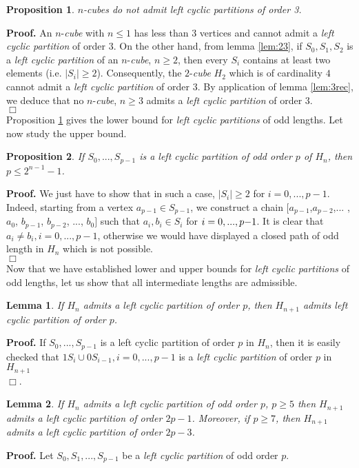 \documentclass{article}
\newtheorem{lemma}{Lemma}
\newtheorem{proposition}{Proposition}
\begin{document}
\begin{proposition}  \label{prop:pas3}
$n$-cubes do not  admit left cyclic partitions of order 3. 
\end{proposition}
{\bf Proof.} An $n$-{\em cube} with $n\leq 1$ has less than $3$ vertices and
 cannot admit a {\em left cyclic partition} of order $3$. On the other hand,
 from lemma \ref{lem:23}, if $S_0,S_1,S_2$ is a {\em left cyclic partition} of
 an $n$-{\em cube}, $n\geq 2$, then every $S_i$ contains at least two elements
 (i.e. $|S_i|\geq 2$). Consequently, the $2$-{\em cube} $H_2$ which is of
 cardinality $4$ cannot admit a {\em left cyclic partition} of order $3$. By application of lemma
 \ref{lem:3rec}, we deduce that no $n$-{\em cube}, $n\geq 3$ admits a {\em left
 cyclic partition} of order $3$.\\
 $\Box$
\\
Proposition \ref{prop:pas3} gives the lower bound for {\em left cyclic partitions} of odd lengths. 
Let now study the upper bound.
\begin{proposition}   \label{prop:ibound}
If $S_0,...,S_{p-1}$ is a left cyclic partition of odd order $p$ of $H_n$, then 
$p\leq 2^{n-1}-1$. 
\end{proposition}
{\bf Proof.} We just have to show that in such a case,   
$|S_i|\geq 2$ for $i=0,...,p-1$. Indeed, starting from a vertex $a_{p-1}\in S_{p-1}$, 
we construct a chain $[a_{p-1}$,$ a_{p-2}$,$ ...$ , 
$a_0$, $b_{p-1}$, $b_{p-2}$, $...$, $b_0]$ such 
that $a_i,b_i\in S_i$ for $i=0,...,p{\rm -}1$. It is clear that $a_i\neq b_i,i=0,...,p-1$, otherwise 
we would have displayed a closed path of odd length in $H_n$ which is not
possible.\\
 $\Box$
\\
Now that we have established lower and upper bounds for {\em left cyclic
  partitions} of odd lengths, let us show that 
all intermediate lengths are admissible.
\begin{lemma}   \label{lem:rec}
If $H_n$ admits a {\em left cyclic partition} of order $p$, then $H_{n+1}$ 
admits left cyclic partition of order $p$.
\end{lemma}
{\bf Proof.} If $S_0,...,S_{p-1}$ is a left cyclic partition of order 
$p$ in $H_n$, then it is easily checked that $1S_i\cup 0S_{i-1},i=0,...,p-1$ is
a {\em left cyclic 
partition} of order $p$ in $H_{n+1}$\\
 $\Box$.

\begin{lemma}   \label{lem:suiv}
If $H_n$ admits a {\em left cyclic partition} of odd order $p$, $p\geq 5$ then $H_{n+1}$  
admits a {\em left cyclic partition} of order $2p-1$. Moreover, if $p\geq 7$, then 
$H_{n+1}$ admits a left cyclic partition of order $2p-3$.
\end{lemma}
{\bf Proof.} Let $S_0,S_1,...,S_{p-1}$ be a {\em left cyclic partition} of
odd order $p$.
\end{document}
